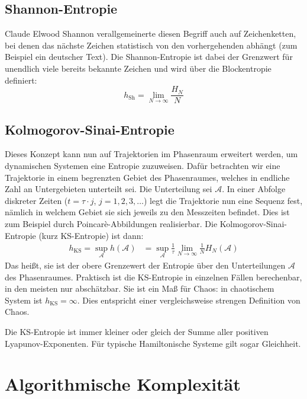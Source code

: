 \documentclass[a4paper]{scrartcl}
\begin{document}
\subsection{Shannon-Entropie}
Claude Elwood Shannon verallgemeinerte diesen Begriff auch auf Zeichenketten, bei denen das n\"achste Zeichen statistisch von den vorhergehenden abh\"angt (zum Beispiel ein deutscher Text). Die Shannon-Entropie ist dabei der Grenzwert f\"ur unendlich viele bereits bekannte Zeichen und wird \"uber die Blockentropie definiert:
\[
  h_{\text{Sh}} = \lim_{N \rightarrow \infty} \frac{H_N}{N}
\]

\subsection{Kolmogorov-Sinai-Entropie}
Dieses Konzept kann nun auf Trajektorien im Phasenraum erweitert werden, um dynamischen Systemen eine Entropie zuzuweisen. Daf\"ur betrachten wir eine Trajektorie in einem begrenzten Gebiet des Phasenraumes, welches in endliche Zahl an Untergebieten unterteilt sei. Die Unterteilung sei $\mathcal{A}$. In einer Abfolge diskreter Zeiten ($t=\tau \cdot j$, $j=1, 2, 3, \ldots$) legt die Trajektorie nun eine Sequenz fest, n\"amlich in welchem Gebiet sie sich jeweils zu den Messzeiten befindet. Dies ist zum Beispiel durch Poincar\`e-Abbildungen realisierbar. Die Kolmogorov-Sinai-Entropie (kurz KS-Entropie) ist dann:
\begin{align*}
  h_{\text{KS}} = \sup_{\mathcal{A}} h\left( \mathcal{A} \right) &= \sup_{\mathcal{A}} \frac{1}{\tau} \lim_{N \rightarrow \infty} \frac{1}{N} H_N \left( \mathcal{A} \right)
\end{align*}
Das hei\ss{}t, sie ist der obere Grenzewert der Entropie \"uber den Unterteilungen $\mathcal{A}$ des Phasenraumes. Praktisch ist die KS-Entropie in einzelnen F\"allen berechenbar, in den meisten nur absch\"atzbar. Sie ist ein Ma\ss{} f\"ur Chaos: in chaotischem System ist $h_{\text{KS}} = \infty$. Dies entspricht einer vergleichsweise strengen Definition von Chaos.

Die KS-Entropie ist immer kleiner oder gleich der Summe aller positiven Lyapunov-Exponenten. F\"ur typische Hamiltonische Systeme gilt sogar Gleichheit.

\section{Algorithmische Komplexit\"at}
\end{document}
